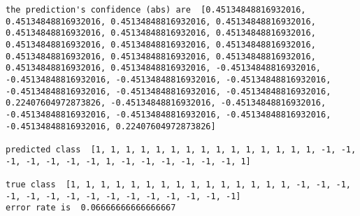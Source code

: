 \documentclass[11pt]{article}
\begin{document}
    \begin{Verbatim}[commandchars=\\\{\}]
the prediction's confidence (abs) are  [0.45134848816932016, 0.45134848816932016, 0.45134848816932016, 0.45134848816932016, 0.45134848816932016, 0.45134848816932016, 0.45134848816932016, 0.45134848816932016, 0.45134848816932016, 0.45134848816932016, 0.45134848816932016, 0.45134848816932016, 0.45134848816932016, 0.45134848816932016, 0.45134848816932016, -0.45134848816932016, -0.45134848816932016, -0.45134848816932016, -0.45134848816932016, -0.45134848816932016, -0.45134848816932016, -0.45134848816932016, 0.22407604972873826, -0.45134848816932016, -0.45134848816932016, -0.45134848816932016, -0.45134848816932016, -0.45134848816932016, -0.45134848816932016, 0.22407604972873826] 

predicted class  [1, 1, 1, 1, 1, 1, 1, 1, 1, 1, 1, 1, 1, 1, 1, -1, -1, -1, -1, -1, -1, -1, 1, -1, -1, -1, -1, -1, -1, 1] 

true class  [1, 1, 1, 1, 1, 1, 1, 1, 1, 1, 1, 1, 1, 1, 1, -1, -1, -1, -1, -1, -1, -1, -1, -1, -1, -1, -1, -1, -1, -1]
error rate is  0.06666666666666667

    \end{Verbatim}
\end{document}
